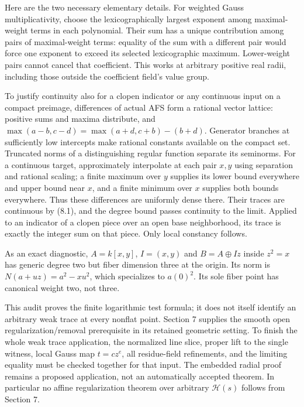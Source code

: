\documentclass[
  10pt,
]{article}
\begin{document}
Here are the two necessary elementary details. For weighted Gauss
multiplicativity, choose the lexicographically largest exponent among
maximal-weight terms in each polynomial. Their sum has a unique
contribution among pairs of maximal-weight terms: equality of the sum
with a different pair would force one exponent to exceed its selected
lexicographic maximum. Lower-weight pairs cannot cancel that
coefficient. This works at arbitrary positive real radii, including
those outside the coefficient field's value group.

To justify continuity also for a clopen indicator or any continuous
input on a compact preimage, differences of actual AFS form a rational
vector lattice: positive sums and maxima distribute, and
\(\max(a-b,c-d)=\max(a+d,c+b)-(b+d)\). Generator branches at
sufficiently low intercepts make rational constants available on the
compact set. Truncated norms of a distinguishing regular function
separate its seminorms. For a continuous target, approximately
interpolate at each pair \(x,y\) using separation and rational scaling;
a finite maximum over \(y\) supplies its lower bound everywhere and
upper bound near \(x\), and a finite minimum over \(x\) supplies both
bounds everywhere. Thus these differences are uniformly dense there.
Their traces are continuous by (8.1), and the degree bound passes
continuity to the limit. Applied to an indicator of a clopen piece over
an open base neighborhood, its trace is exactly the integer sum on that
piece. Only local constancy follows.

As an exact diagnostic, \(A=k[x,y]\), \(I=(x,y)\) and \(B=A\oplus Iz\)
inside \(z^2=x\) has generic degree two but fiber dimension three at the
origin. Its norm is \(N(a+uz)=a^2-xu^2\), which specializes to
\(a(0)^2\). Its sole fiber point has canonical weight two, not three.

This audit proves the finite logarithmic test formula; it does not
itself identify an arbitrary weak trace at every nonflat point. Section
7 supplies the smooth open regularization/removal prerequisite in its
retained geometric setting. To finish the whole weak trace application,
the normalized line slice, proper lift to the single witness, local
Gauss map \(t=cz^e\), all residue-field refinements, and the limiting
equality must be checked together for that input. The embedded radial
proof remains a proposed application, not an automatically accepted
theorem. In particular no affine regularization theorem over arbitrary
\(\mathcal H(s)\) follows from Section 7.
\end{document}
